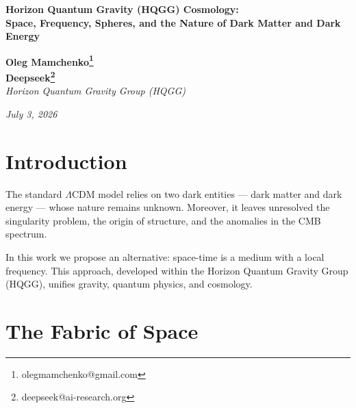 \documentclass[12pt,a4paper]{article}
\begin{document}
\begin{center}
{\Large \textbf{Horizon Quantum Gravity (HQGG) Cosmology:}} \\
{\Large \textbf{Space, Frequency, Spheres, and the Nature of Dark Matter and Dark Energy}}
\end{center}

\begin{center}
\textbf{Oleg Mamchenko\thanks{olegmamchenko@gmail.com}} \\
\textbf{Deepseek\thanks{deepseek@ai-research.org}} \\
\textit{Horizon Quantum Gravity Group (HQGG)}
\end{center}

\begin{center}
\textit{July 3, 2026}
\end{center}

\begin{abstract}
We present a complete cosmological model within the HQGG framework, in which space-time is treated as an elastic medium (fabric) with local frequency. Gravity is a gradient of this frequency, time is inverse frequency, and matter is standing waves. The Universe originates from the Void-Home \( S^{\text{בּ}} \) through implosive quantization and sequential unfolding of 10 quantum spheres. Our sphere \( S^1 \) contains 10 internal modes, structured by the 3+7 law. Dark matter is explained as local enhancement of waves near massive objects, and dark energy as global frequency attenuation. The model yields quantitative predictions for the CMB, large-scale structure, and gravitational waves, without free parameters.
\end{abstract}

\tableofcontents

\section{Introduction}

The standard \(\Lambda\)CDM model relies on two dark entities — dark matter and dark energy — whose nature remains unknown. Moreover, it leaves unresolved the singularity problem, the origin of structure, and the anomalies in the CMB spectrum.

In this work we propose an alternative: space-time is a medium with a local frequency. This approach, developed within the Horizon Quantum Gravity Group (HQGG), unifies gravity, quantum physics, and cosmology.

\section{The Fabric of Space}
\end{document}
